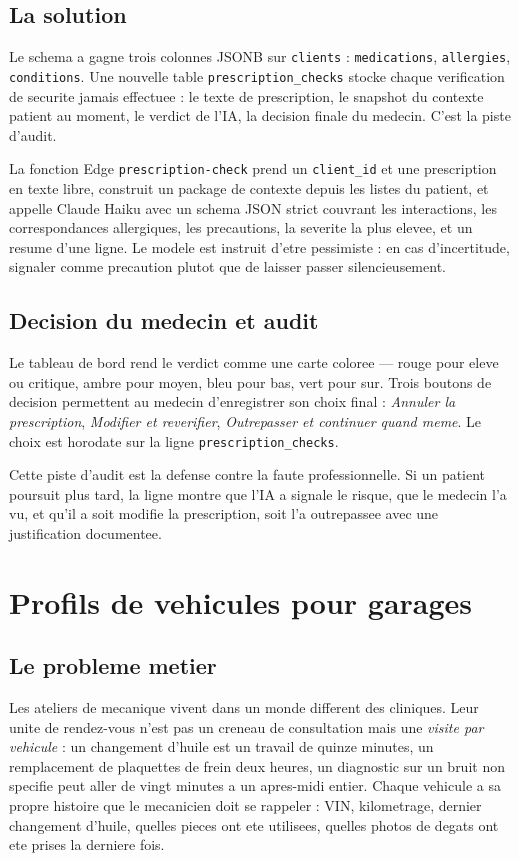 \subsection{La solution}
Le schema a gagne trois colonnes JSONB sur \texttt{clients} :
\texttt{medications}, \texttt{allergies}, \texttt{conditions}. Une
nouvelle table \texttt{prescription\_checks} stocke chaque
verification de securite jamais effectuee : le texte de prescription,
le snapshot du contexte patient au moment, le verdict de l'IA, la
decision finale du medecin. C'est la piste d'audit.

La fonction Edge \texttt{prescription-check} prend un
\texttt{client\_id} et une prescription en texte libre, construit un
package de contexte depuis les listes du patient, et appelle Claude
Haiku avec un schema JSON strict couvrant les interactions, les
correspondances allergiques, les precautions, la severite la plus
elevee, et un resume d'une ligne. Le modele est instruit d'etre
pessimiste : en cas d'incertitude, signaler comme precaution plutot
que de laisser passer silencieusement.

\subsection{Decision du medecin et audit}
Le tableau de bord rend le verdict comme une carte coloree --- rouge
pour eleve ou critique, ambre pour moyen, bleu pour bas, vert pour
sur. Trois boutons de decision permettent au medecin d'enregistrer
son choix final : \emph{Annuler la prescription}, \emph{Modifier et
reverifier}, \emph{Outrepasser et continuer quand meme}. Le choix est
horodate sur la ligne \texttt{prescription\_checks}.

Cette piste d'audit est la defense contre la faute professionnelle.
Si un patient poursuit plus tard, la ligne montre que l'IA a signale
le risque, que le medecin l'a vu, et qu'il a soit modifie la
prescription, soit l'a outrepassee avec une justification documentee.

\section{Profils de vehicules pour garages}

\subsection{Le probleme metier}
Les ateliers de mecanique vivent dans un monde different des
cliniques. Leur unite de rendez-vous n'est pas un creneau de
consultation mais une \emph{visite par vehicule} : un changement
d'huile est un travail de quinze minutes, un remplacement de
plaquettes de frein deux heures, un diagnostic sur un bruit non
specifie peut aller de vingt minutes a un apres-midi entier. Chaque
vehicule a sa propre histoire que le mecanicien doit se rappeler :
VIN, kilometrage, dernier changement d'huile, quelles pieces ont ete
utilisees, quelles photos de degats ont ete prises la derniere fois.

